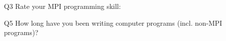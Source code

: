 \begin{description}%
\item{Q3} Rate your MPI programming skill:%
\item{Q5} How long have you been writing computer programs (incl. non-MPI programs)?%
\end{description}%
